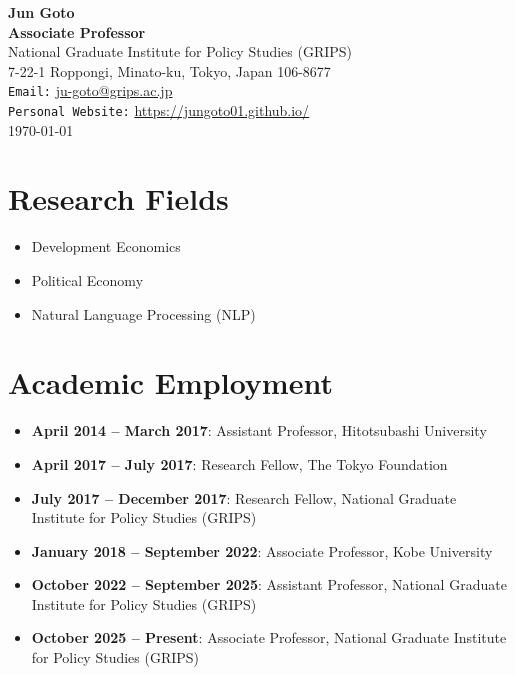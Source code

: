 \documentclass[12pt]{article}
\begin{document}
\thispagestyle{empty}

\begin{center}
    {\Large \textbf{Jun Goto}} \\
    \vspace{2mm}
    \textbf{Associate Professor} \\
    National Graduate Institute for Policy Studies (GRIPS) \\
    7-22-1 Roppongi, Minato-ku, Tokyo, Japan 106-8677 \\
    \vspace{2mm}
    \texttt{Email:} \href{mailto:ju-goto@grips.ac.jp}{ju-goto@grips.ac.jp} \\
    \texttt{Personal Website:} \href{https://jungoto01.github.io/}{https://jungoto01.github.io/} \\
    \vspace{2mm}
    \today
\end{center}

\vspace{0.5cm}

\section*{Research Fields}
\begin{itemize}
    \item Development Economics
    \item Political Economy
    \item Natural Language Processing (NLP)
\end{itemize}

\section*{Academic Employment}
\begin{itemize}
    \item \textbf{April 2014 -- March 2017}: Assistant Professor, Hitotsubashi University
    \item \textbf{April 2017 -- July 2017}: Research Fellow, The Tokyo Foundation
    \item \textbf{July 2017 -- December 2017}: Research Fellow, National Graduate Institute for Policy Studies (GRIPS)
    \item \textbf{January 2018 -- September 2022}: Associate Professor, Kobe University
    \item \textbf{October 2022 -- September 2025}: Assistant Professor, National Graduate Institute for Policy Studies (GRIPS)
    \item \textbf{October 2025 -- Present}: Associate Professor, National Graduate Institute for Policy Studies (GRIPS)
\end{itemize}
\end{document}
